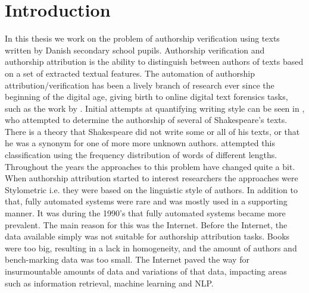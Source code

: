 %

\section{Introduction} \label{sec:introduction}


In this thesis we work on the problem of authorship verification using texts
written by Danish secondary school pupils. Authorship verification and
authorship attribution is the ability to distinguish between authors of texts
based on a set of extracted textual features. The automation of authorship
attribution/verification has been a lively branch of research ever since the
beginning of the digital age, giving birth to online digital text forensics
tasks, such as the work by \citet{pan:2015}. Initial attempts at quantifying
writing style can be seen in \citet{Mendenhall237}, who attempted to determine
the authorship of several of Shakespeare's texts. There is a theory that
Shakespeare did not write some or all of his texts, or that he was a synonym
for one of more more unknown authors. \citet{Mendenhall237} attempted this
classification using the frequency distribution of words of different lengths.
Throughout the years the approaches to this problem have changed quite a bit.
When authorship attribution started to interest researchers the approaches were
Stylometric i.e. they were based on the linguistic style of authors. In addition
to that, fully automated systems were rare and was mostly used in a supporting
manner. It was during the 1990's that fully automated systems became more
prevalent. The main reason for this was the Internet. Before the Internet, the
data available simply was not suitable for authorship attribution tasks. Books
were too big, resulting in a lack in homogeneity, and the amount of authors and
bench-marking data was too small. The Internet paved the way for insurmountable
amounts of data and variations of that data, impacting areas such as information
retrieval, machine learning and \gls{NLP}.

